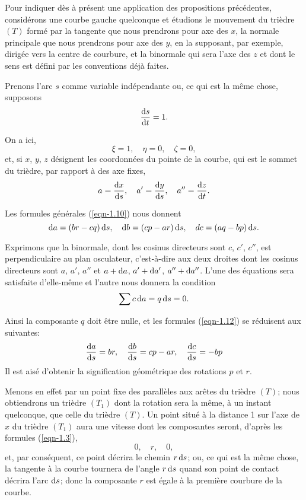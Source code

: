  Pour indiquer dès à présent une application des propositions précédentes, considérons une courbe gauche 
quelconque et étudions le mouvement du trièdre $(T)$ formé par la tangente que nous prendrons pour axe des $x$, la 
normale principale que nous prendrons pour axe des $y$, en la supposant, par exemple, dirigée vers la centre de 
courbure, et la binormale qui sera l'axe des $z$ et dont le sens est défini par les conventions déjà faites.

Prenons l'arc $s$ comme variable indépendante ou, ce qui est la même chose, supposons
\[
	\frac{\operatorname{d}\!{s}}{\operatorname{d}\!{t}} = 1.
\]

On a ici,
\[
	\xi = 1, \quad \eta = 0, \quad \zeta = 0,
\]
et, si $x$, $y$, $z$ désignent les coordonnées du pointe de la courbe, qui est le sommet du trièdre, par rapport à des 
axe fixes,
\[
	a = \frac{\operatorname{d}\!{x}}{\operatorname{d}\!{s}}, \quad a' = \frac{\operatorname{d}\!{y}}{\operatorname{d}\!{s}}, \quad a'' = \frac{\operatorname{d}\!{z}}{\operatorname{d}\!{t}}.
\]

Les formules générales (\ref{eqn-1.10}) nous donnent
\begin{equation}
	\operatorname{d}\!{a} = (br - cq)\operatorname{d}\!{s}, \quad \operatorname{d}\!{b} = (cp - ar)\operatorname{d}\!{s}, \quad dc = (aq - bp)\operatorname{d}\!{s}.
	\label{eqn-1.12}
\end{equation}

Exprimons que la binormale, dont les cosinus directeurs sont $c$, $c'$, $c''$, est perpendiculaire au plan osculateur, 
c'est-à-dire aux deux droites dont les cosinus directeurs sont $a$, $a'$, $a''$ et $a + \operatorname{d}\!{a}$, $a' + \operatorname{d}\!{a'}$, $a'' + 
\operatorname{d}\!{a''}$. L'une des équations sera satisfaite d'elle-même et l'autre nous donnera la condition
\[
	\sum{c}\operatorname{d}\!{a} = q \operatorname{d}\!{s} = 0.
\]

Ainsi la composante $q$ doit être nulle, et les formules (\ref{eqn-1.12}) se réduisent aux suivantes:
\begin{equation}
	\frac{\operatorname{d}\!{a}}{\operatorname{d}\!{s}} = br, \quad \frac{\operatorname{d}\!{b}}{\operatorname{d}\!{s}} = cp - ar, \quad \frac{\operatorname{d}\!{c}}{\operatorname{d}\!{s}} = - bp
	\label{eqn-1.13}
\end{equation}
Il est aisé d'obtenir la signification géométrique des rotations $p$ et $r$.

Menons en effet par un point fixe des parallèles aux arêtes du trièdre $(T)$; nous obtiendrons un trièdre $(T_1)$ dont 
la rotation sera la même, à un instant quelconque, que celle du trièdre $(T)$. Un point situé à la distance 1 sur l'axe 
de $x$ du trièdre $(T_1)$ aura une vitesse dont les composantes seront, d'après les formules (\ref{eqn-1.3}),
\[
	0, \quad r, \quad 0,
\]
et, par conséquent, ce point décrira le chemin $r \operatorname{d}\!{s}$; ou, ce qui est la même chose, la tangente à la courbe 
tournera de l'angle $r \operatorname{d}\!{s}$ quand son point de contact décrira l'arc $\operatorname{d}\!{s}$; donc la composante $r$ est égale à la 
première courbure de la courbe.

